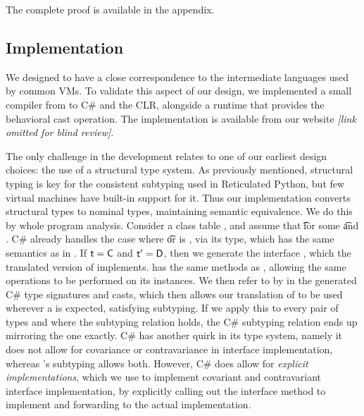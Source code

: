 \documentclass[acmlarge, anonymous, authordraft, review]{acmart} %
\begin{document}
% 

\noindent
The complete proof is available in the appendix.

\subsection{Implementation}

We designed \kafka to have a close correspondence to the intermediate
languages used by common VMs. To validate this aspect of our design, we
implemented a small compiler from \kafka to C\# and the CLR, alongside a
runtime that provides the behavioral cast operation. The implementation is
available from our website \emph{[link omitted for blind review]}.

The only challenge in the development relates to one of our earliest design
choices: the use of a structural type system. As previously mentioned,
structural typing is key for the consistent subtyping used in Reticulated
Python, but few virtual machines have built-in support for it. Thus our
implementation converts structural types to nominal types, maintaining
semantic equivalence.  We do this by whole program analysis. Consider a
class table \K, and assume that \StrSub{}\K\t\tp for some \t and \tp. C\#
already handles the case where \t or \tp is \any, via its  type,
which has the same semantics as \any in \kafka. If $\t=\C$ and $\tp=\D$,
then we generate the interface , which the translated version of \C
implements.  has the same methods as \D, allowing the same operations
to be performed on its instances. We then refer to \D by  in the
generated C\# type signatures and casts, which then allows our translation
of \C to be used wherever a \D is expected, satisfying subtyping. If we
apply this to every pair of types \C and \D where the subtyping relation
holds, the C\# subtyping relation ends up mirroring the \kafka one exactly.
C\# has another quirk in its type system, namely it does not allow for
covariance or contravariance in interface implementation, whereas \kafka's
subtyping allows both. However, C\# does allow for \emph{explicit
  implementations}, which we use to implement covariant and contravariant
interface implementation, by explicitly calling out the interface method to
implement and forwarding to the actual implementation.
\end{document}
